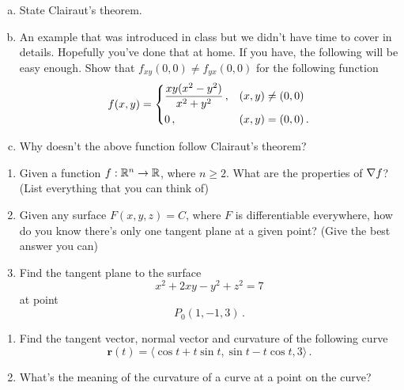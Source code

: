 \documentclass[12pt]{article}
\begin{document}
\newpage
\begin{problem}
    \begin{enumerate}[a.]
        \item State Clairaut's theorem.
        \item An example that was introduced in class but we didn't have 
            time to cover in details. Hopefully you've done that at home.
            If you have, the following will be easy enough.
            Show that $f_{xy}(0,0) \not= f_{yx}(0,0)$ for the following function
            \begin{equation*}
                f(x,y) = 
                \begin{dcases}
                    \frac{xy(x^2 - y^2)}{x^2 + y^2} \,, & (x,y) \not= (0,0) \\
                    0 \,, & (x,y) = (0,0) \,.
                \end{dcases}
            \end{equation*}
        \item Why doesn't the above function follow Clairaut's theorem?
    \end{enumerate}
\end{problem}


\newpage
\begin{problem}
\begin{enumerate}
    \item Given a function $f:\mathbb{R}^n \to \mathbb{R}$, where $n\geq 2$.
        What are the properties of $\nabla f$? (List everything that you can think of)
    \item Given any surface $F(x,y,z) = C$, where $F$ is differentiable everywhere, how do you know there's only one tangent plane at a given point?
        (Give the best answer you can)
    \item Find the tangent plane to the surface
        \begin{equation*}
            x^2 + 2xy - y^2 + z^2 =7 
        \end{equation*}
        at point
        \begin{equation*}
            P_0(1,-1,3) \,.
        \end{equation*}
\end{enumerate}
\end{problem}


\newpage
\begin{problem}
    \begin{enumerate}
        \item Find the tangent vector, normal vector and curvature of the following curve
    \begin{equation*}
        \textbf{r}(t) = \langle \cos t + t \sin t, \sin t - t\cos t, 3 \rangle \,.
    \end{equation*}
    \item What's the meaning of the curvature of a curve at a point on the curve?
    \end{enumerate}

\end{problem}
\end{document}
